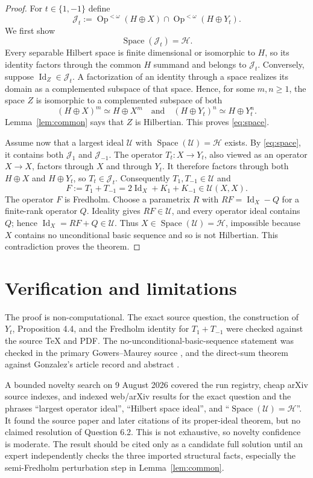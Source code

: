 \documentclass[11pt]{article}
\newcommand{\Space}{\operatorname{Space}}
\newcommand{\Opp}{\operatorname{Op}^{<\omega}}
\newcommand{\Id}{\operatorname{Id}}
\newcommand{\cH}{\mathcal H}
\newcommand{\cJ}{\mathcal J}
\begin{document}
\begin{proof}
For $t\in\{1,-1\}$ define
\[
 \cJ_t:=\Opp(H\oplus X)\cap\Opp(H\oplus Y_t).
\]
We first show
\begin{equation}\label{eq:space}
 \Space(\cJ_t)=\cH.
\end{equation}
Every separable Hilbert space is finite dimensional or isomorphic to $H$, so
its identity factors through the common $H$ summand and belongs to $\cJ_t$.
Conversely, suppose $\Id_Z\in\cJ_t$. A factorization of an identity through a
space realizes its domain as a complemented subspace of that space. Hence,
for some $m,n\geq1$, the space $Z$ is isomorphic to a complemented subspace of
both
\[
 (H\oplus X)^m\simeq H\oplus X^m
 \quad\text{and}\quad
 (H\oplus Y_t)^n\simeq H\oplus Y_t^n.
\]
Lemma~\ref{lem:common} says that $Z$ is Hilbertian. This proves
\eqref{eq:space}.

Assume now that a largest ideal $\mathcal U$ with
$\Space(\mathcal U)=\cH$ exists. By \eqref{eq:space}, it contains both
$\cJ_1$ and $\cJ_{-1}$. The operator $T_t:X\to Y_t$, also viewed as an
operator $X\to X$, factors through $X$ and through $Y_t$. It therefore
factors through both $H\oplus X$ and $H\oplus Y_t$, so $T_t\in\cJ_t$.
Consequently $T_1,T_{-1}\in\mathcal U$ and
\[
 F:=T_1+T_{-1}=2\Id_X+K_1+K_{-1}\in\mathcal U(X,X).
\]
The operator $F$ is Fredholm. Choose a parametrix $R$ with
$RF=\Id_X-Q$ for a finite-rank operator $Q$. Ideality gives $RF\in\mathcal U$,
and every operator ideal contains $Q$; hence $\Id_X=RF+Q\in\mathcal U$.
Thus $X\in\Space(\mathcal U)=\cH$, impossible because $X$ contains no
unconditional basic sequence and so is not Hilbertian. This contradiction
proves the theorem.
\end{proof}

\section{Verification and limitations}

The proof is non-computational. The exact source question, the construction
of $Y_t$, Proposition 4.4, and the Fredholm identity for $T_1+T_{-1}$ were
checked against the source TeX and PDF. The no-unconditional-basic-sequence
statement was checked in the primary Gowers--Maurey source
\cite[Section~5.2]{GM}, and the direct-sum theorem against Gonzalez's article
record and abstract \cite{Gonzalez}.

A bounded novelty search on 9 August 2026 covered the run registry, cheap
arXiv source indexes, and indexed web/arXiv results for the exact question and
the phrases ``largest operator ideal'', ``Hilbert space ideal'', and
``$\Space(\mathcal U)=\cH$''. It found the source paper and later citations of
its proper-ideal theorem, but no claimed resolution of Question 6.2. This is
not exhaustive, so novelty confidence is moderate. The result should be cited
only as a candidate full solution until an expert independently checks the
three imported structural facts, especially the semi-Fredholm perturbation
step in Lemma~\ref{lem:common}.
\end{document}
